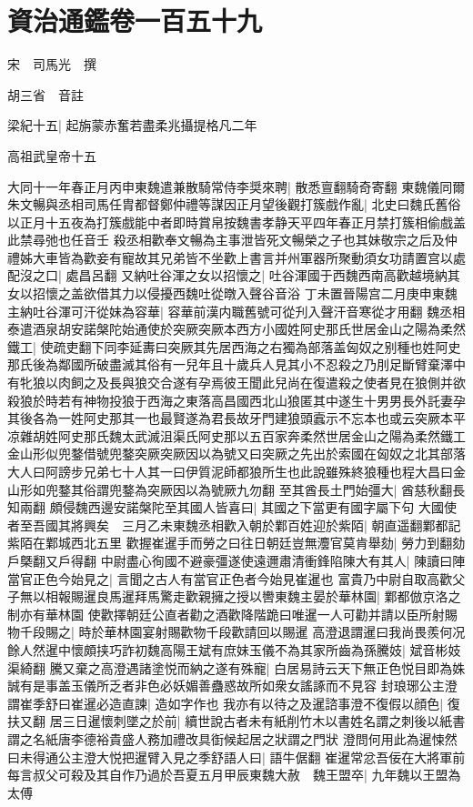 \section{資治通鑑卷一百五十九}
宋　司馬光　撰

胡三省　音註

梁紀十五|{
	起旃蒙赤奮若盡柔兆攝提格凡二年}


高祖武皇帝十五

大同十一年春正月丙申東魏遣兼散騎常侍李奨來聘|{
	散悉亶翻騎奇寄翻}
東魏儀同爾朱文暢與丞相司馬任胄都督鄭仲禮等謀因正月望後觀打簇戲作亂|{
	北史曰魏氏舊俗以正月十五夜為打簇戲能中者即時賞帛按魏書孝静天平四年春正月禁打簇相偷戲盖此禁尋弛也任音壬}
殺丞相歡奉文暢為主事泄皆死文暢榮之子也其妹敬宗之后及仲禮姊大車皆為歡妾有寵故其兄弟皆不坐歡上書言并州軍器所聚動須女功請置宫以處配沒之口|{
	處昌呂翻}
又納吐谷渾之女以招懷之|{
	吐谷渾國于西魏西南高歡越境納其女以招懷之盖欲借其力以侵擾西魏吐從暾入聲谷音浴}
丁未置晉陽宫二月庚申東魏主納吐谷渾可汗從妹為容華|{
	容華前漢内職舊號可從刋入聲汗音寒從才用翻}
魏丞相泰遣酒泉胡安諾槃陀始通使於突厥突厥本西方小國姓阿史那氏世居金山之陽為柔然鐵工|{
	使疏吏翻下同李延夀曰突厥其先居西海之右獨為部落盖匈奴之别種也姓阿史那氏後為鄰國所破盡滅其俗有一兒年且十歲兵人見其小不忍殺之乃刖足斷臂棄澤中有牝狼以肉飼之及長與狼交合遂有孕焉彼王聞此兒尚在復遣殺之使者見在狼側并欲殺狼於時若有神物投狼于西海之東落高昌國西北山狼匿其中遂生十男男長外託妻孕其後各為一姓阿史那其一也最賢遂為君長故牙門建狼頭蠧示不忘本也或云突厥本平凉雜胡姓阿史那氏魏太武滅沮渠氏阿史那以五百家奔柔然世居金山之陽為柔然鐵工金山形似兜鍪借號兜鍪突厥突厥因以為號又曰突厥之先出於索國在匈奴之北其部落大人曰阿謗步兄弟七十人其一曰伊質泥師都狼所生也此說雖殊終狼種也程大昌曰金山形如兜鍪其俗謂兜鍪為突厥因以為號厥九勿翻}
至其酋長土門始彊大|{
	酋慈秋翻長知兩翻}
頗侵魏西邊安諾槃陀至其國人皆喜曰|{
	其國之下當更有國字屬下句}
大國使者至吾國其將興矣　三月乙未東魏丞相歡入朝於鄴百姓迎於紫陌|{
	朝直遥翻鄴都記紫陌在鄴城西北五里}
歡握崔暹手而勞之曰往日朝廷豈無灋官莫肯舉劾|{
	勞力到翻劾戶槩翻又戶得翻}
中尉盡心徇國不避豪彊遂使遠邇肅清衝鋒陷陳大有其人|{
	陳讀曰陣}
當官正色今始見之|{
	言聞之古人有當官正色者今始見崔暹也}
富貴乃中尉自取高歡父子無以相報賜暹良馬暹拜馬驚走歡親擁之授以轡東魏主晏於華林園|{
	鄴都倣京洛之制亦有華林園}
使歡擇朝廷公直者勸之酒歡降階跪曰唯暹一人可勸并請以臣所射賜物千段賜之|{
	時於華林園宴射賜歡物千段歡請回以賜暹}
高澄退謂暹曰我尚畏羨何况餘人然暹中懷頗挟巧詐初魏高陽王斌有庶妹玉儀不為其家所齒為孫騰妓|{
	斌音彬妓渠綺翻}
騰又棄之高澄遇諸塗悦而納之遂有殊寵|{
	白居易詩云天下無正色悦目即為姝誠有是事盖玉儀所乏者非色必妖媚善蠱惑故所如衆女謠諑而不見容}
封琅琊公主澄謂崔季舒曰崔暹必造直諫|{
	造如字作也}
我亦有以待之及暹諮事澄不復假以顔色|{
	復扶又翻}
居三日暹懷刺墜之於前|{
	續世說古者未有紙削竹木以書姓名謂之刺後以紙書謂之名紙唐李德裕貴盛人務加禮改具衘候起居之狀謂之門狀}
澄問何用此為暹悚然曰未得通公主澄大悦把暹臂入見之季舒語人曰|{
	語牛倨翻}
崔暹常忿吾佞在大將軍前每言叔父可殺及其自作乃過於吾夏五月甲辰東魏大赦　魏王盟卒|{
	九年魏以王盟為太傅}


